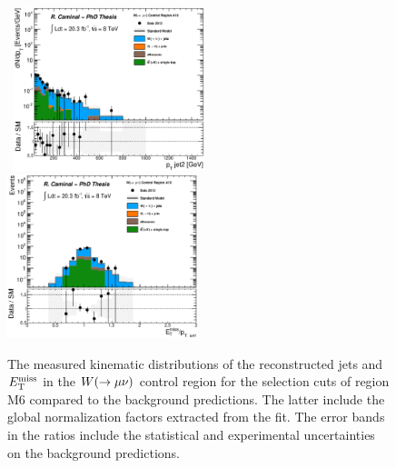 \begin{figure}[!ht]
\begin{center}
{    }
    \mbox{
      \includegraphics[width=0.495\textwidth]{Appendix_FluctuationM6/Figures/plot_Stop_A10_CRwmn_pt2_fitted.eps}
      \includegraphics[width=0.495\textwidth]{Appendix_FluctuationM6/Figures/plot_Stop_A10_CRwmn_metpt1_fitted.eps}
    }
  \end{center}
  \caption[Kinematic distributions of the reconstructed jets and $\met$ in the $\wmn$+jets control region for the selection cuts of region M6, after the normalization factors extracted from the fit have been applied.]{The measured kinematic distributions of the reconstructed jets and $\met$ in the $\wmn$ control region for the selection cuts of region M6 compared to the background predictions. The latter include the global normalization factors extracted from the fit. The error bands in the ratios include the statistical and experimental uncertainties on the background predictions.}
  \label{fig:Plot_M6_CRwmn_Jetkinematics}
\end{figure}

